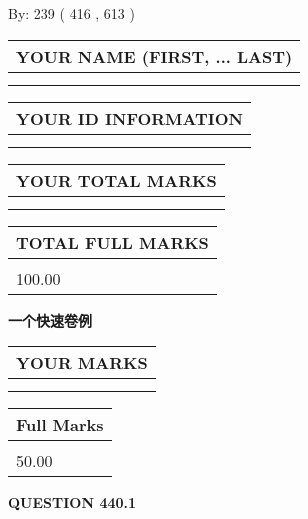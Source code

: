 \documentclass{ctexart}
\begin{document}
   
\hspace{1.0in} By: 
 239 ( 416 ,  613 )
   
   
   
   
\newpage 
\setcounter{page}{ 
   440001 } 
   
   
   
   
\noindent\begin{tabular}{|l|}
\hline
YOUR NAME (FIRST, ... LAST)  \\
\hline
 \\ 
 \\ 
\hline
\end{tabular}
\hspace{0.05in} \begin{tabular}{|l|}
\hline
 YOUR   ID   INFORMATION  \\
\hline
 \\ 
 \\ 
\hline
\end{tabular}
   
   
\vspace{0.2in}\noindent\begin{tabular}{|l|}
\hline
YOUR TOTAL MARKS  \\
\hline
 \\ 
 \\ 
\hline
\end{tabular}
\hspace{0.05in} \begin{tabular}{|l|}
\hline
TOTAL FULL MARKS  \\
\hline
 \\ 
100.00 \\
\hline
\end{tabular}
   
   
 \vspace{0.2in}
{\LARGE {\textbf{ 一个快速卷例}}}
   
   
  
\vspace{0.2in}
  
\noindent\begin{tabular}{|l|}
\hline
 YOUR MARKS  \\
\hline
 \\ 
 \\ 
\hline
\end{tabular}
\hspace{0.05in} \begin{tabular}{|l|}
\hline
 Full Marks  \\
\hline
 \\ 
50.00 \\
\hline
\end{tabular}
{\textbf{\Large{QUESTION
440.1 
}}}
  
\end{document}
